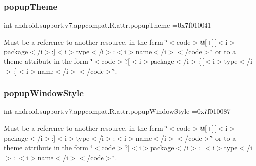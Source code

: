 \subsubsection{\texorpdfstring{popup\+Theme}{popupTheme}}
{\footnotesize\ttfamily int android.\+support.\+v7.\+appcompat.\+R.\+attr.\+popup\+Theme =0x7f010041\hspace{0.3cm}{\ttfamily [static]}}

Must be a reference to another resource, in the form \char`\"{}$<$code$>$@\mbox{[}+\mbox{]}\mbox{[}$<$i$>$package$<$/i$>$\+:\mbox{]}$<$i$>$type$<$/i$>$\+:$<$i$>$name$<$/i$>$$<$/code$>$\char`\"{} or to a theme attribute in the form \char`\"{}$<$code$>$?\mbox{[}$<$i$>$package$<$/i$>$\+:\mbox{]}\mbox{[}$<$i$>$type$<$/i$>$\+:\mbox{]}$<$i$>$name$<$/i$>$$<$/code$>$\char`\"{}. \mbox{\label{classandroid_1_1support_1_1v7_1_1appcompat_1_1R_1_1attr_a5b684a34260eff69eb7de3101f52d178}} 
\subsubsection{\texorpdfstring{popup\+Window\+Style}{popupWindowStyle}}
{\footnotesize\ttfamily int android.\+support.\+v7.\+appcompat.\+R.\+attr.\+popup\+Window\+Style =0x7f010087\hspace{0.3cm}{\ttfamily [static]}}

Must be a reference to another resource, in the form \char`\"{}$<$code$>$@\mbox{[}+\mbox{]}\mbox{[}$<$i$>$package$<$/i$>$\+:\mbox{]}$<$i$>$type$<$/i$>$\+:$<$i$>$name$<$/i$>$$<$/code$>$\char`\"{} or to a theme attribute in the form \char`\"{}$<$code$>$?\mbox{[}$<$i$>$package$<$/i$>$\+:\mbox{]}\mbox{[}$<$i$>$type$<$/i$>$\+:\mbox{]}$<$i$>$name$<$/i$>$$<$/code$>$\char`\"{}. \mbox{\label{classandroid_1_1support_1_1v7_1_1appcompat_1_1R_1_1attr_abe233b217b211968e10d98d011e83813}} 
